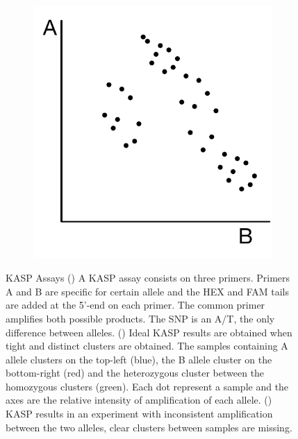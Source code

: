 \begin{figure}
\begin{subfigure}{0.45\textwidth}
    \includegraphics[width=1\textwidth]{PolyMarker/Figures/intro/kaspFail.pdf}
    \end{subfigure}

\caption[KASP Assays]{KASP Assays () A KASP assay consists on three primers. Primers A and B are specific for certain allele and the HEX and FAM tails are added at the 5'-end on each primer. The common primer amplifies both possible products. The SNP is an A/T, the only difference between alleles. () Ideal KASP results are obtained when tight and distinct clusters are obtained. The samples containing A allele clusters on the top-left (blue), the B allele cluster on the bottom-right (red) and the heterozygous cluster between the homozygous clusters (green). Each dot represent a sample and the axes are the relative intensity of amplification of each allele. () KASP results in an experiment with inconsistent amplification between the two alleles, clear clusters between samples  are missing. }
\end{figure}


